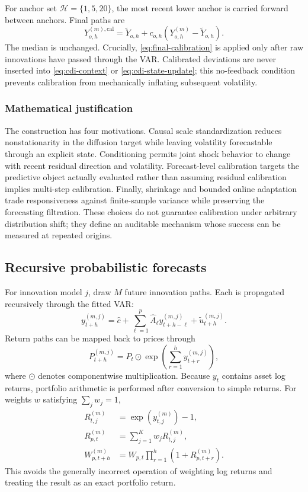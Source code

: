 \documentclass[11pt]{article}
\begin{document}
For anchor set $\mathcal H=\{1,5,20\}$, the most recent lower anchor is carried forward between anchors. Final paths are
\begin{equation}
    Y_{o,h}^{(m),\mathrm{cal}}
    =\widetilde Y_{o,h}
    +c_{o,h}\left(Y_{o,h}^{(m)}-\widetilde Y_{o,h}\right).
    \label{eq:final-calibration}
\end{equation}
The median is unchanged. Crucially, \eqref{eq:final-calibration} is applied only after raw innovations have passed through the VAR. Calibrated deviations are never inserted into \eqref{eq:cdi-context} or \eqref{eq:cdi-state-update}; this no-feedback condition prevents calibration from mechanically inflating subsequent volatility.

\subsubsection{Mathematical justification}

The construction has four motivations. Causal scale standardization reduces nonstationarity in the diffusion target while leaving volatility forecastable through an explicit state. Conditioning permits joint shock behavior to change with recent residual direction and volatility. Forecast-level calibration targets the predictive object actually evaluated rather than assuming residual calibration implies multi-step calibration. Finally, shrinkage and bounded online adaptation trade responsiveness against finite-sample variance while preserving the forecasting filtration. These choices do not guarantee calibration under arbitrary distribution shift; they define an auditable mechanism whose success can be measured at repeated origins.

\subsection{Recursive probabilistic forecasts}

For innovation model $j$, draw $M$ future innovation paths. Each is propagated recursively through the fitted VAR:
\begin{equation}
    y_{t+h}^{(m,j)}=\widehat c+
    \sum_{\ell=1}^{p}\widehat A_{\ell}
    y_{t+h-\ell}^{(m,j)}
    +\widetilde u_{t+h}^{(m,j)}.
    \label{eq:recursive}
\end{equation}
Return paths can be mapped back to prices through
\begin{equation}
    P_{t+h}^{(m,j)}=P_t\odot
    \exp\left(\sum_{r=1}^{h}y_{t+r}^{(m,j)}\right),
\end{equation}
where $\odot$ denotes componentwise multiplication. Because $y_t$ contains asset log returns, portfolio arithmetic is performed after conversion to simple returns. For weights $w$ satisfying $\sum_jw_j=1$,
\begin{align}
    R_{t,j}^{(m)} &= \exp(y_{t,j}^{(m)})-1,\\
    R_{p,t}^{(m)} &= \sum_{j=1}^K w_jR_{t,j}^{(m)},\\
    W_{p,t+h}^{(m)} &= W_{p,t}
    \prod_{r=1}^{h}\left(1+R_{p,t+r}^{(m)}\right).
\end{align}
This avoids the generally incorrect operation of weighting log returns and treating the result as an exact portfolio return.
\end{document}
